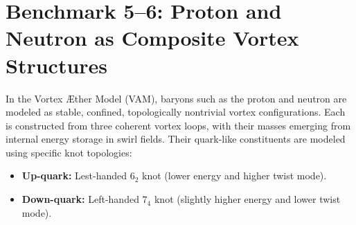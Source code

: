 \section{Benchmark 5--6: Proton and Neutron as Composite Vortex Structures}

In the Vortex \AE ther Model (VAM), baryons such as the proton and neutron are modeled as stable, confined, topologically nontrivial vortex configurations. Each is constructed from three coherent vortex loops, with their masses emerging from internal energy storage in swirl fields. Their quark-like constituents are modeled using specific knot topologies:

\begin{itemize}
    \item \textbf{Up-quark:} Lest-handed \( 6_2 \) knot (lower energy and higher twist mode).
    \item \textbf{Down-quark:} Left-handed \( 7_4 \) knot (slightly higher energy and lower twist mode).
\end{itemize}

